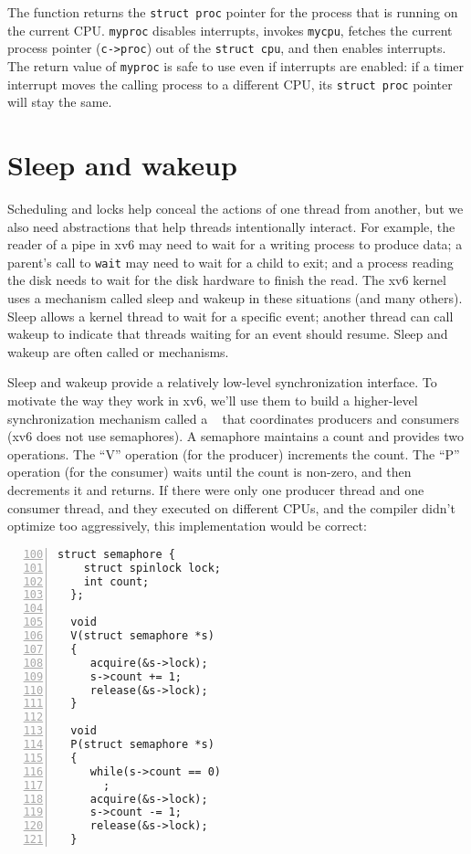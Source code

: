 The function
returns the
\lstinline{struct proc}
pointer
for the process that is running on the current CPU.
\lstinline{myproc}
disables interrupts, invokes
\lstinline{mycpu},
fetches the current process pointer
(\lstinline{c->proc})
out of the
\lstinline{struct cpu},
and then enables interrupts.
The return value of
\lstinline{myproc}
is safe to use even if interrupts are enabled:
if a timer interrupt moves the calling process to a
different CPU, its
\lstinline{struct proc}
pointer will stay the same.
\section{Sleep and wakeup}
\label{sec:sleep}

Scheduling and locks help conceal the actions of one thread
from another,
but we also need abstractions that help
threads intentionally interact.
For example, the reader of a pipe in xv6 may need to wait
for a writing process to produce data;
a parent's call to \lstinline{wait} may need to
wait for a child to exit; and
a process reading the disk needs to wait
for the disk hardware to finish the read.
The xv6 kernel uses a mechanism called sleep and wakeup
in these situations (and many others).
Sleep allows a kernel thread to
wait for a specific event; another thread can call wakeup 
to indicate that threads waiting for an event should resume.
Sleep and wakeup are often called 
or 
mechanisms.

Sleep and wakeup provide a relatively low-level synchronization
interface. To motivate the way they work in xv6,
we'll use them to build a higher-level
synchronization mechanism called a ~\cite{dijkstra65} that
coordinates producers and consumers
(xv6 does not use semaphores).
A semaphore maintains a count and provides two operations.
The ``V'' operation (for the producer) increments the count.
The ``P'' operation (for the consumer) waits until the count is non-zero,
and then decrements it and returns.
If there were only one producer thread and one consumer thread,
and they executed on different CPUs,
and the compiler didn't optimize too aggressively,
this implementation would be correct:
\begin{lstlisting}[numbers=left,firstnumber=100]
  struct semaphore {
    struct spinlock lock;
    int count;
  };

  void
  V(struct semaphore *s)
  {
     acquire(&s->lock);
     s->count += 1;
     release(&s->lock);
  }

  void
  P(struct semaphore *s)
  {
     while(s->count == 0)
       ;
     acquire(&s->lock);
     s->count -= 1;
     release(&s->lock);
  }
\end{lstlisting}

